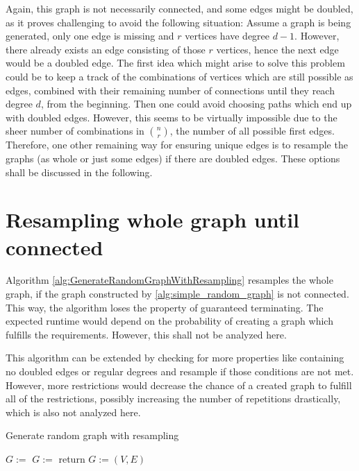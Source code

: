 Again, this graph is not necessarily connected, and some edges might be doubled, as it proves challenging to avoid the following situation: Assume a graph is being generated, only one edge is missing and $r$ vertices have degree $d-1$. However, there already exists an edge consisting of those $r$ vertices, hence the next edge would be a doubled edge. The first idea which might arise to solve this problem could be to keep a track of the combinations of vertices which are still possible as edges, combined with their remaining number of connections until they reach degree $d$, from the beginning. Then one could avoid choosing paths which end up with doubled edges. However, this seems to be virtually impossible due to the sheer number of combinations in $n\choose r$, the number of all possible first edges. Therefore, one other remaining way for ensuring unique edges is to resample the graphs (as whole or just some edges) if there are doubled edges. These options shall be discussed in the following.

\section{Resampling whole graph until connected}
Algorithm \ref{alg:GenerateRandomGraphWithResampling} resamples the whole graph, if the graph constructed by \cref{alg:simple_random_graph} is not connected. This way, the algorithm loses the property of guaranteed terminating. The expected runtime would depend on the probability of creating a graph which fulfills the requirements. However, this shall not be analyzed here. 


This algorithm can be extended by checking for more properties like containing no doubled edges or regular degrees and resample if those conditions are not met. However, more restrictions would decrease the chance of a created graph to fulfill all of the restrictions, possibly increasing the number of repetitions drastically, which is also not analyzed here.



\begin{algorithm}[htpb]
	\caption{Generate random graph with resampling\label{alg:GenerateRandomGraphWithResampling}} 
	\begin{algorithmic}
		\State $G:=$ 
		\State $G:=$ 
		\EndWhile
		\State return $G:=(V,E)$	
		\EndFunction 
	\end{algorithmic}
\end{algorithm}	

